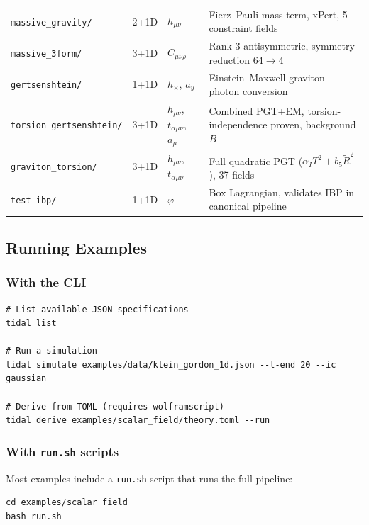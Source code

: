 \begin{table}[htbp]
\begin{tabular}{@{}llll@{}}
\texttt{massive\_gravity/}         & 2+1D & $h_{\mu\nu}$          & Fierz--Pauli mass term, xPert, 5 constraint fields \\
\texttt{massive\_3form/}           & 3+1D & $C_{\mu\nu\rho}$      & Rank-3 antisymmetric, symmetry reduction $64 \to 4$ \\
\texttt{gertsenshtein/}            & 1+1D & $h_\times$, $a_y$     & Einstein--Maxwell graviton--photon conversion \\
\texttt{torsion\_gertsenshtein/}   & 3+1D & $h_{\mu\nu}$, $t_{\alpha\mu\nu}$, $a_\mu$ & Combined PGT+EM, torsion-independence proven, background $B$ \\
\texttt{graviton\_torsion/}        & 3+1D & $h_{\mu\nu}$, $t_{\alpha\mu\nu}$ & Full quadratic PGT ($\alpha_I T^2 + b_5 \tilde{R}^2$), 37 fields \\
\texttt{test\_ibp/}                & 1+1D & $\varphi$             & Box Lagrangian, validates IBP in canonical pipeline \\
\bottomrule
\end{tabular}
\end{table}

\subsection{Running Examples}

\subsubsection{With the CLI}

\begin{lstlisting}[style=bash]
# List available JSON specifications
tidal list

# Run a simulation
tidal simulate examples/data/klein_gordon_1d.json --t-end 20 --ic gaussian

# Derive from TOML (requires wolframscript)
tidal derive examples/scalar_field/theory.toml --run
\end{lstlisting}

\subsubsection{With \texttt{run.sh} scripts}

Most examples include a \texttt{run.sh} script that runs the full pipeline:

\begin{lstlisting}[style=bash]
cd examples/scalar_field
bash run.sh
\end{lstlisting}

